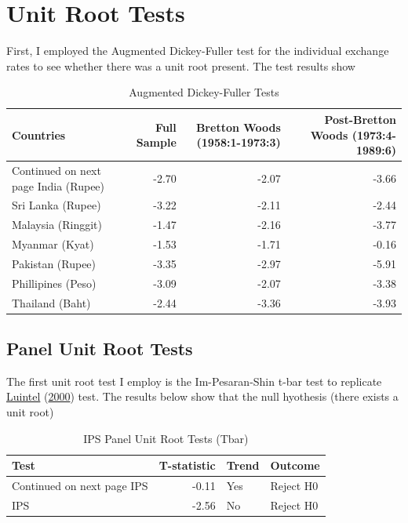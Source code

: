 \documentclass[11pt,preprint, authoryear]{elsarticle}
\numberwithin{equation}{section}
\numberwithin{figure}{section}
\numberwithin{table}{section}
\begin{document}
\hypertarget{unit-root-tests}{%
\section{\texorpdfstring{Unit Root Tests
\label{Unit}}{Unit Root Tests }}\label{unit-root-tests}}

First, I employed the Augmented Dickey-Fuller test for the individual
exchange rates to see whether there was a unit root present. The test
results show

\begingroup\fontsize{11pt}{12pt}\selectfont
\begin{longtable}{lrrr}
\caption{Augmented Dickey-Fuller Tests} \\ 
  \toprule
Countries & Full Sample & Bretton Woods (1958:1-1973:3) & Post-Bretton Woods (1973:4-1989:6) \\ 
  \hline 
\endhead 
\hline 
{\footnotesize Continued on next page} 
\endfoot 
\endlastfoot 
 \midrule
India (Rupee) & -2.70 & -2.07 & -3.66 \\ 
  Sri Lanka (Rupee) & -3.22 & -2.11 & -2.44 \\ 
  Malaysia (Ringgit) & -1.47 & -2.16 & -3.77 \\ 
  Myanmar (Kyat) & -1.53 & -1.71 & -0.16 \\ 
  Pakistan (Rupee) & -3.35 & -2.97 & -5.91 \\ 
  Phillipines (Peso) & -3.09 & -2.07 & -3.38 \\ 
  Thailand (Baht) & -2.44 & -3.36 & -3.93 \\ 
   \bottomrule
\end{longtable}
\endgroup

\hypertarget{panel-unit-root-tests}{%
\subsection{Panel Unit Root Tests}\label{panel-unit-root-tests}}

The first unit root test I employ is the Im-Pesaran-Shin t-bar test to
replicate \protect\hyperlink{ref-Kul}{Luintel}
(\protect\hyperlink{ref-Kul}{2000}) test. The results below show that
the null hyothesis (there exists a unit root)
\begingroup\fontsize{12pt}{13pt}\selectfont

\begin{longtable}{lrll}
\caption{IPS Panel Unit Root Tests (Tbar)} \\ 
  \toprule
Test & T-statistic & Trend & Outcome \\ 
  \hline 
\endhead 
\hline 
{\footnotesize Continued on next page} 
\endfoot 
\endlastfoot 
 \midrule
IPS & -0.11 & Yes & Reject H0 \\ 
  IPS & -2.56 & No & Reject H0 \\ 
   \bottomrule
\end{longtable}
\endgroup
\end{document}
